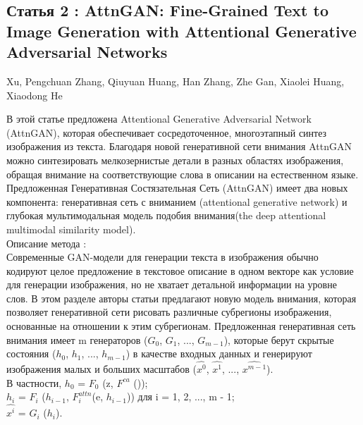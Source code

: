 \documentclass{article}
\begin{document}
\begin{center} 
\subsection{Статья 2 : AttnGAN: Fine-Grained Text to Image Generation
with Attentional Generative Adversarial Networks}
      \hugeTao Xu, Pengchuan Zhang, Qiuyuan Huang, Han Zhang, Zhe Gan, Xiaolei Huang, Xiaodong He\\ [1.3cm]
    \end{center} 
      \large В этой статье предложена Attentional Generative Adversarial Network (AttnGAN), которая обеспечивает сосредоточенное,
многоэтапный синтез изображения из текста. Благодаря новой генеративной сети внимания AttnGAN можно синтезировать мелкозернистые детали в разных областях изображения, обращая внимание на соответствующие слова в описании на естественном языке.
Предложенная Генеративная Состязательная Сеть (AttnGAN) имеет два новых компонента: генеративная сеть с вниманием (attentional generative network) и глубокая
мультимодальная модель подобия внимания(the deep
attentional multimodal similarity model).\\

Описание метода :\\
Современные GAN-модели для генерации текста в изображения обычно кодируют целое предложение в текстовое описание в одном векторе как условие для генерации изображения, но не хватает детальной информации на уровне слов. В этом разделе авторы статьи предлагают новую модель внимания, которая позволяет генеративной сети рисовать различные субрегионы изображения, основанные на отношении к этим субрегионам.
Предложенная генеративная сеть внимания имеет m генераторов ($G_{0}$, $G_{1}$, ..., $G_{m - 1}$), которые берут скрытые состояния ($h_{0}$, $h_{1}$, ..., $h_{m - 1}$) в качестве входных данных и генерируют изображения малых и больших масштабов ($\hat{x^0}$, $\hat{x^1}$, ..., $\hat{x^{m - 1}}$).\\
В частности,
$h_{0}$ = $F_{0}$ (z, $F^{ca}$ ());\\
$h_{i}$ = $F_{i}$ ($h_{i - 1}$, $F^{attn}_{i} $(e, $h_{i - 1}$)) для i = 1, 2, ..., m - 1;\\
$\hat{x^i}$ = $G_{i}$ ($h_{i}$).
\end{document}
